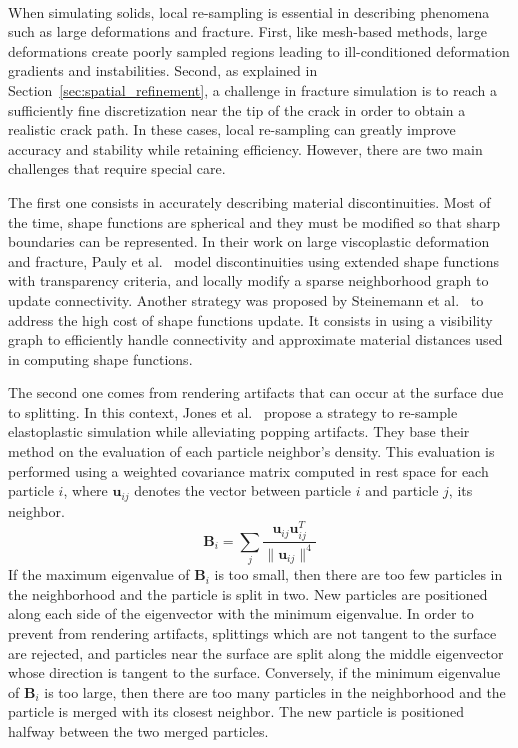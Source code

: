 \paragraph*{}
When simulating solids, local re-sampling is essential in describing phenomena such as large deformations and fracture. First, like mesh-based methods, large deformations create poorly sampled regions leading to ill-conditioned deformation gradients and instabilities. Second, as explained in Section~\ref{sec:spatial_refinement}, a challenge in fracture simulation is to reach a sufficiently fine discretization near the tip of the crack in order to obtain a realistic crack path. In these cases, local re-sampling can greatly improve accuracy and stability while retaining efficiency. However, there are two main challenges that require special care.

The first one consists in accurately describing material discontinuities. Most of the time, shape functions are spherical and they must be modified so that sharp boundaries can be represented. In their work on large viscoplastic deformation and fracture, Pauly et al.~\cite{Pauly2005} model discontinuities using extended shape functions with transparency criteria, and locally modify a sparse neighborhood graph to update connectivity. Another strategy was proposed by Steinemann et al.~\cite{Steinemann2009} to address the high cost of shape functions update. It consists in using a visibility graph to efficiently handle connectivity and approximate material distances used in computing shape functions.

The second one comes from rendering artifacts that can occur at the surface due to splitting. In this context, Jones et al.~\cite{Jones:2014:DEF} propose a strategy to re-sample elastoplastic simulation while alleviating popping artifacts. They base their method on the evaluation of each particle neighbor's density. This evaluation is performed using a weighted covariance matrix computed in rest space for each particle $i$, where $\mathbf{u}_{ij}$ denotes the vector between particle $i$ and particle $j$, its neighbor.
\begin{equation}
\label{eq:jones_re-sampling}
\mathbf{B}_{i} = \sum_{j}  \frac{\mathbf{u}_{ij}\mathbf{u}_{ij}^{T}}{\| \mathbf{u}_{ij} \|^{4}}
\end{equation}
If the maximum eigenvalue of $\mathbf{B}_{i}$ is too small, then there are too few particles in the neighborhood and the particle is split in two. New particles are positioned along each side of the eigenvector with the minimum eigenvalue. In order to prevent from rendering artifacts, splittings which are not tangent to the surface are rejected, and particles near the surface are split along the middle eigenvector whose direction is tangent to the surface. Conversely, if the minimum eigenvalue of $\mathbf{B}_{i}$ is too large, then there are too many particles in the neighborhood and the particle is merged with its closest neighbor. The new particle is positioned halfway between the two merged particles.

